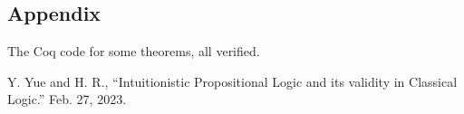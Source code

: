 \documentclass{article}
\newtheorem{theorem}{Theorem}[section]
\newcommand{\brs}[1]{\llbracket#1\rrbracket_\sigma}
\begin{document}




\subsection*{Appendix}
The Coq code for some theorems, all verified.


\begin{thebibliography}{9}
     Y. Yue and H. R., “Intuitionistic Propositional Logic and its validity in Classical Logic.” Feb. 27, 2023.
\end{thebibliography}
\end{document}
